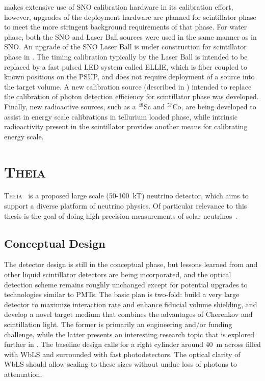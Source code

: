 {\snop} makes extensive use of SNO calibration hardware in its calibration effort, however, upgrades of the deployment hardware are planned for scintillator phase to meet the more stringent background requirements of that phase.
For water phase, both the SNO \N and Laser Ball sources were used in the same manner as in SNO.
An upgrade of the SNO Laser Ball is under construction for scintillator phase in {\snop}.
The timing calibration typically by the Laser Ball is intended to be replaced by a fast pulsed LED system called ELLIE, which is fiber coupled to known positions on the PSUP, and does not require deployment of a source into the target volume.
A new calibration source (described in ) intended to replace the \N calibration of photon detection efficiency for scintillator phase was developed.
Finally, new radioactive sources, such as a $^{48}$Sc and $^{57}$Co, are being developed to assist in energy scale calibrations in tellurium loaded phase, while intrinsic radioactivity present in the scintillator provides another means for calibrating energy scale.

\section{\textsc{Theia}}

\textsc{Theia}~\cite{theia,asdc} is a proposed large scale (50-100~kT) neutrino detector, which aims to support a diverse platform of neutrino physics. 
Of particular relevance to this thesis is the goal of doing high precision measurements of solar neutrinos~\cite{theia_solar}.

\subsection{Conceptual Design}
The detector design is still in the conceptual phase, but lessons learned from {\snop} and other liquid scintillator detectors are being incorporated, and the optical detection scheme remains roughly unchanged except for potential upgrades to technologies similar to PMTs.
The basic plan is two-fold: build a very large detector to maximize interaction rate and enhance fiducial volume shielding, and develop a novel target medium that combines the advantages of Cherenkov and scintillation light.
The former is primarily an engineering and/or funding challenge, while the latter presents an interesting research topic that is explored further in .
The baseline design calls for a right cylinder around 40~m across filled with WbLS and surrounded with fast photodetectors.
The optical clarity of WbLS should allow scaling to these sizes without undue loss of photons to attenuation.


